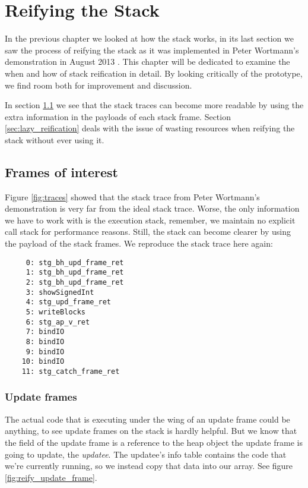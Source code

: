 \chapter{Reifying the Stack}

In the previous chapter we looked at how the stack works, in its
last section we saw the process of reifying the stack as it was
implemented in Peter Wortmann's demonstration in August 2013
\cite{stack_traces_ticket}. This chapter will be dedicated to examine
the when and how of stack reification in detail. By looking critically
of the prototype, we find room both for improvement and discussion.

In section \ref{sec:frames_of_interest} we see that the stack traces can become more
readable by using the extra information in the payloads of each stack
frame. Section \ref{sec:lazy_reification} deals with the issue of wasting
resources when reifying the stack without ever using it.

\section{Frames of interest} \label{sec:frames_of_interest}

Figure \ref{fig:traces} showed that the stack trace from Peter Wortmann's
demonstration is very far from the ideal stack trace.  Worse, the only
information we have to work with is the execution stack, remember, we maintain no
explicit call stack for performance reasons. Still, the stack can become
clearer by using the payload of the stack frames. We reproduce the stack trace here again:

\begin{verbatim}
     0: stg_bh_upd_frame_ret
     1: stg_bh_upd_frame_ret
     2: stg_bh_upd_frame_ret
     3: showSignedInt
     4: stg_upd_frame_ret
     5: writeBlocks
     6: stg_ap_v_ret
     7: bindIO
     8: bindIO
     9: bindIO
    10: bindIO
    11: stg_catch_frame_ret
\end{verbatim}


\subsection{Update frames} \label{sec:update_frames}

The actual code that is executing under the wing of an update frame
could be anything, to see update frames on the stack is hardly helpful.
But we know that the field of the update frame is a reference to the
heap object the update frame is going to update, the \emph{updatee}. The updatee's
info table contains the code that we're currently running, so we instead
copy that data into our array. See figure \ref{fig:reify_update_frame}.

